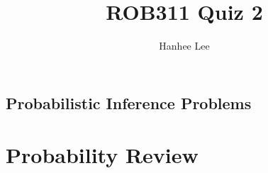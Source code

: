 \documentclass{article}
\title{ROB311 Quiz 2}
\author{Hanhee Lee}
\begin{document}
\maketitle

\tableofcontents
\newpage

\begin{center}
    \section*{Probabilistic Inference Problems}
\end{center}

\section{Probability Review}

\newpage
\end{document}
